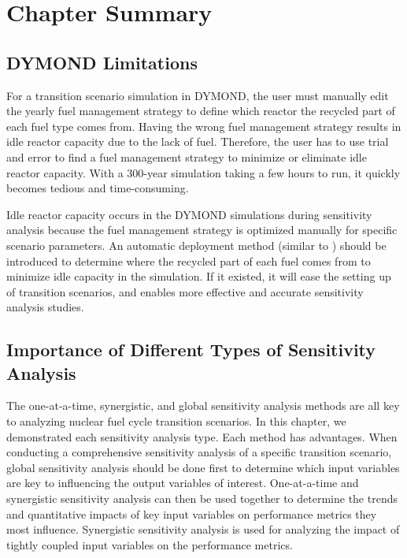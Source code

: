 \section{Chapter Summary}
\subsection{DYMOND Limitations}
For a transition scenario simulation in DYMOND, the user must 
manually edit the yearly fuel management strategy to define
which reactor the recycled part of each fuel type comes from. 
Having the wrong fuel management strategy results in idle reactor
capacity due to the lack of fuel. 
Therefore, the user has to use trial and error to find a fuel 
management strategy to minimize or eliminate idle reactor capacity. 
With a 300-year simulation taking a few hours to run, it quickly 
becomes tedious and time-consuming.  

Idle reactor capacity occurs in the DYMOND simulations during 
sensitivity analysis 
because the fuel management strategy is 
optimized manually for specific scenario parameters.
An automatic deployment method (similar to \deploy) 
should be introduced to 
determine where the recycled part of each fuel comes from to 
minimize idle capacity in the simulation. 
If it existed, it will ease the setting up of transition scenarios, and enables 
more effective and accurate sensitivity analysis studies.

\subsection{Importance of Different Types of Sensitivity Analysis}
The one-at-a-time, synergistic, and global sensitivity analysis methods 
are all key to analyzing nuclear fuel cycle transition scenarios. 
In this chapter, we demonstrated each sensitivity analysis type. 
Each method has advantages. 
When conducting a comprehensive sensitivity analysis of a specific 
transition scenario, 
global sensitivity analysis should be done first to 
determine which input variables are key to influencing the output 
variables of interest. 
One-at-a-time and synergistic sensitivity analysis can then be used together to 
determine the trends and quantitative impacts 
of key input variables on performance metrics they most influence. 
Synergistic sensitivity analysis is used for analyzing the impact of 
tightly coupled input variables on the performance metrics.  
